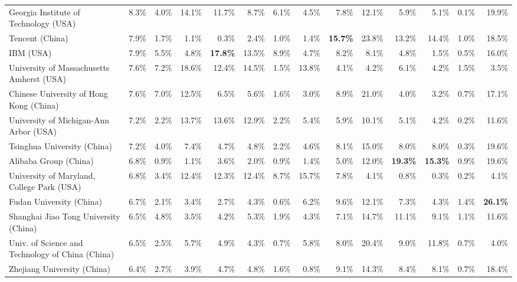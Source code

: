 \begin{tabular}{lc|rrrrrr|rrrrrr}
    Georgia Institute of Technology (USA) & 8.3\% & 4.0\% & 14.1\% & 11.7\% & 8.7\% & 6.1\% & 4.5\% & 7.8\% & 12.1\% & 5.9\% & 5.1\% & 0.1\% & 19.9\% \\
    Tencent (China) & 7.9\% & 1.7\% & 1.1\% & 0.3\% & 2.4\% & 1.0\% & 1.4\% & \bfseries 15.7\% & 23.8\% & 13.2\% & 14.4\% & 1.0\% & 18.5\% \\
    IBM (USA) & 7.9\% & 5.5\% & 4.8\% & \bfseries 17.8\% & 13.5\% & 8.9\% & 4.7\% & 8.2\% & 8.1\% & 4.8\% & 1.5\% & 0.5\% & 16.0\% \\
    University of Massachusetts Amherst (USA) & 7.6\% & 7.2\% & 18.6\% & 12.4\% & 14.5\% & 1.5\% & 13.8\% & 4.1\% & 4.2\% & 6.1\% & 4.2\% & 1.5\% & 3.5\% \\
    Chinese University of Hong Kong (China) & 7.6\% & 7.0\% & 12.5\% & 6.5\% & 5.6\% & 1.6\% & 3.0\% & 8.9\% & 21.0\% & 4.0\% & 3.2\% & 0.7\% & 17.1\% \\
    University of Michigan-Ann Arbor (USA) & 7.2\% & 2.2\% & 13.7\% & 13.6\% & 12.9\% & 2.2\% & 5.4\% & 5.9\% & 10.1\% & 5.1\% & 4.2\% & 0.2\% & 11.6\% \\
    Tsinghua University (China) & 7.2\% & 4.0\% & 7.4\% & 4.7\% & 4.8\% & 2.2\% & 4.6\% & 8.1\% & 15.0\% & 8.0\% & 8.0\% & 0.3\% & 19.6\% \\
    Alibaba Group (China) & 6.8\% & 0.9\% & 1.1\% & 3.6\% & 2.0\% & 0.9\% & 1.4\% & 5.0\% & 12.0\% & \bfseries 19.3\% & \bfseries 15.3\% & 0.9\% & 19.6\% \\
    University of Maryland, College Park (USA) & 6.8\% & 3.4\% & 12.4\% & 12.3\% & 12.4\% & 8.7\% & 15.7\% & 7.8\% & 4.1\% & 0.8\% & 0.3\% & 0.2\% & 4.1\% \\
    Fudan University (China) & 6.7\% & 2.1\% & 3.4\% & 2.7\% & 4.3\% & 0.6\% & 6.2\% & 9.6\% & 12.1\% & 7.3\% & 4.3\% & 1.4\% & \bfseries 26.1\% \\
    Shanghai Jiao Tong University (China) & 6.5\% & 4.8\% & 3.5\% & 4.2\% & 5.3\% & 1.9\% & 4.3\% & 7.1\% & 14.7\% & 11.1\% & 9.1\% & 1.1\% & 11.6\% \\
    Univ. of Science and Technology of China (China) & 6.5\% & 2.5\% & 5.7\% & 4.9\% & 4.3\% & 0.7\% & 5.8\% & 8.0\% & 20.4\% & 9.0\% & 11.8\% & 0.7\% & 4.0\% \\
    Zhejiang University (China) & 6.4\% & 2.7\% & 3.9\% & 4.7\% & 4.8\% & 1.6\% & 0.8\% & 9.1\% & 14.3\% & 8.4\% & 8.1\% & 0.7\% & 18.4\% \\
    \bottomrule
\end{tabular}